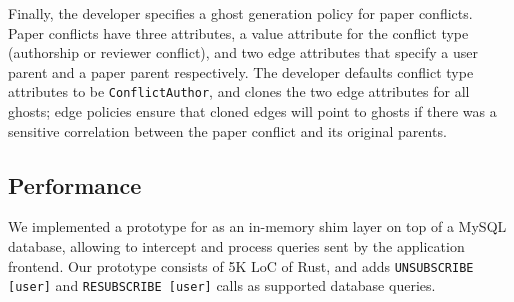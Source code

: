 %
Finally, the developer specifies a ghost generation policy for paper conflicts. Paper conflicts have
three attributes, a value attribute for the conflict type (authorship or reviewer conflict), and two
edge attributes that specify a user parent and a paper parent respectively. The developer defaults
conflict type attributes to be \texttt{ConflictAuthor}, and clones the two edge attributes for all
ghosts; edge policies ensure that cloned edges will point to ghosts if there was a sensitive correlation between
the paper conflict and its original parents. 

%

\subsection{\sys Performance}
We implemented a prototype for \sys as an in-memory shim layer on top
of a MySQL database, allowing \name to intercept and process queries sent by the application frontend. 
Our prototype consists of 5K LoC of Rust, and adds \texttt{UNSUBSCRIBE
[user]} and \texttt{RESUBSCRIBE [user]} calls as supported database queries.

